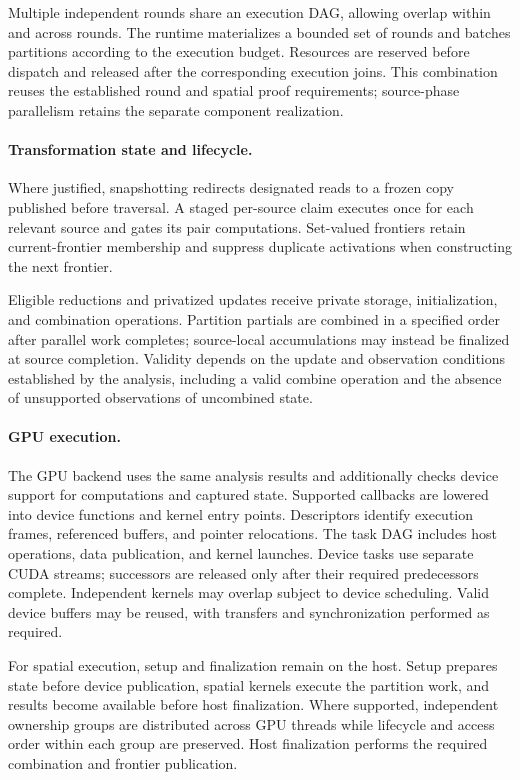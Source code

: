 Multiple independent rounds share an execution DAG, allowing overlap
within and across rounds. The runtime materializes a bounded set of
rounds and batches partitions according to the execution budget.
Resources are reserved before dispatch and released after the
corresponding execution joins. This combination reuses the established
round and spatial proof requirements; source-phase parallelism retains
the separate component realization.

\paragraph{Transformation state and lifecycle.}
Where justified, snapshotting redirects designated reads to a frozen
copy published before traversal. A staged per-source claim executes once
for each relevant source and gates its pair computations. Set-valued
frontiers retain current-frontier membership and suppress duplicate
activations when constructing the next frontier.

Eligible reductions and privatized updates receive private storage,
initialization, and combination operations. Partition partials are
combined in a specified order after parallel work completes; source-local
accumulations may instead be finalized at source completion. Validity
depends on the update and observation conditions established by the
analysis, including a valid combine operation and the absence of
unsupported observations of uncombined state.

\paragraph{GPU execution.}
The GPU backend uses the same analysis results and additionally checks
device support for computations and captured state. Supported callbacks
are lowered into device functions and kernel entry points. Descriptors
identify execution frames, referenced buffers, and pointer relocations.
The task DAG includes host operations, data publication, and kernel
launches. Device tasks use separate CUDA streams; successors are released
only after their required predecessors complete. Independent kernels
may overlap subject to device scheduling. Valid device buffers may be
reused, with transfers and synchronization performed as required.

For spatial execution, setup and finalization remain on the host. Setup
prepares state before device publication, spatial kernels execute the
partition work, and results become available before host finalization.
Where supported, independent ownership groups are distributed across
GPU threads while lifecycle and access order within each group are
preserved. Host finalization performs the required combination and
frontier publication.


